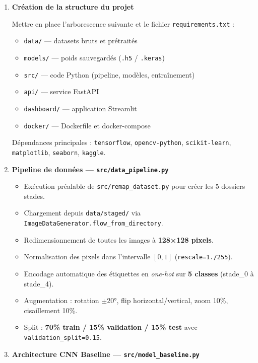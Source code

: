 \documentclass[12pt,a4paper]{article}
\begin{document}
\begin{enumerate}[label=\textbf{Étape \arabic*.}, leftmargin=2.5cm, itemsep=0.4cm]

  \item \textbf{Création de la structure du projet}

  Mettre en place l'arborescence suivante et le fichier \texttt{requirements.txt} :
  \begin{itemize}
    \item \texttt{data/} — datasets bruts et prétraités
    \item \texttt{models/} — poids sauvegardés (\texttt{.h5} / \texttt{.keras})
    \item \texttt{src/} — code Python (pipeline, modèles, entraînement)
    \item \texttt{api/} — service FastAPI
    \item \texttt{dashboard/} — application Streamlit
    \item \texttt{docker/} — Dockerfile et docker-compose
  \end{itemize}
  Dépendances principales : \texttt{tensorflow}, \texttt{opencv-python}, \texttt{scikit-learn}, \texttt{matplotlib}, \texttt{seaborn}, \texttt{kaggle}.

  \item \textbf{Pipeline de données — \texttt{src/data\_pipeline.py}}
  \begin{itemize}
    \item Exécution préalable de \texttt{src/remap\_dataset.py} pour créer les 5 dossiers stades.
    \item Chargement depuis \texttt{data/staged/} via \texttt{ImageDataGenerator.flow\_from\_directory}.
    \item Redimensionnement de toutes les images à \textbf{128×128 pixels}.
    \item Normalisation des pixels dans l'intervalle $[0, 1]$ (\texttt{rescale=1./255}).
    \item Encodage automatique des étiquettes en \textit{one-hot} sur \textbf{5 classes} (stade\_0 à stade\_4).
    \item Augmentation : rotation $\pm$20°, flip horizontal/vertical, zoom 10\%, cisaillement 10\%.
    \item Split : \textbf{70\% train / 15\% validation / 15\% test} avec \texttt{validation\_split=0.15}.
  \end{itemize}

  \item \textbf{Architecture CNN Baseline — \texttt{src/model\_baseline.py}}


\end{enumerate}
\end{document}
